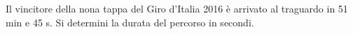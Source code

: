 Il vincitore della nona tappa del Giro d'Italia 2016 
è arrivato al traguardo in 51 min e 45 s. 
Si determini la durata del percorso in secondi.
